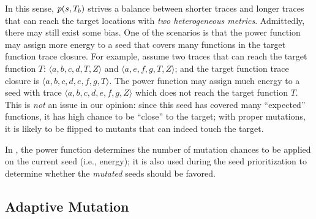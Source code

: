 In this sense, $p(s, T_b)$ strives a balance between shorter traces and longer traces that can reach the target locations with \emph{two heterogeneous metrics}. Admittedly, there may still exist some bias. One of the scenarios is that the power function may assign more energy to a seed that covers many functions in the target function trace closure. For example, assume two traces that can reach the target function $T$: $\langle a,b,c,d,T,Z\rangle$ and $\langle a,e,f,g,T,Z\rangle$; and the target function trace closure is $\langle a, b, c,d,e,f,g,T\rangle$. The power function may assign much energy to a seed with trace $\langle a, b, c, d, e, f, g, Z\rangle$ which does not reach the target function $T$. This is \emph{not} an issue in our opinion: since this seed has covered many ``expected'' functions, it has high chance to be ``close'' to the target; with proper mutations, it is likely to be flipped to mutants that can indeed touch the target.

In {\dFOT}, the power function determines the number of mutation chances to be applied on the current seed (i.e., energy); it is also used during the seed prioritization to determine whether the \emph{mutated} seeds should be favored.

\subsection{Adaptive Mutation} \label{subsec:mutationStr}

